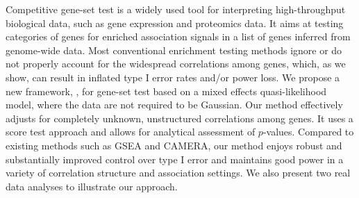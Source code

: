 Competitive gene-set test is a widely used tool for interpreting high-throughput biological 
data, such as gene expression and proteomics data. It aims at testing categories of genes for 
enriched association signals in a list of genes inferred from genome-wide data. Most 
conventional enrichment testing methods ignore or do not properly account for the widespread 
correlations among genes, which, as we show, can result in inflated type I error rates and/or 
power loss. We propose a new framework, \OurMethod, for gene-set test based on a mixed effects 
quasi-likelihood model, where the data are not required to be Gaussian. Our method effectively 
adjusts for completely unknown,	unstructured correlations among genes. It uses a score test 
approach and allows for analytical assessment of $p$-values. Compared to existing methods such 
as GSEA and CAMERA, our method enjoys robust and substantially improved control over type I 
error and maintains good power in a variety of correlation structure and association settings. 
We also present two real data analyses to illustrate our approach.